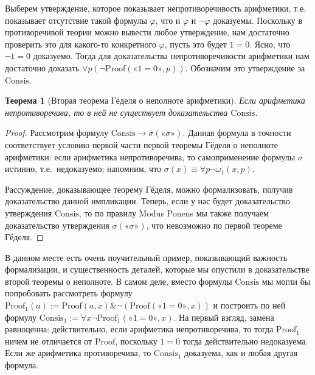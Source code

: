\documentclass[a4paper,11pt]{article}
\newtheorem{thm}{Теорема}[section]
\theoremstyle{definition}
\newcommand{\amp}{\mathbin{\&}}
\newcommand{\gn}[1]{\text{«}#1\text{»}}
\begin{document}
Выберем утверждение, которое показывает непротиворечивость арифметики, т.е.
показывает отсутствие такой формулы $\varphi$, что и $\varphi$ и $\neg\varphi$
доказуемы. Поскольку в противоречивой теории можно вывести любое утверждение,
нам достаточно проверить это для какого-то конкретного $\varphi$, пусть это
будет $1 = 0$. Ясно, что $\neg 1 = 0$ доказуемо. Тогда для доказательства
непротиворечивости арифметики нам достаточно доказать $\forall
p(\neg\mathrm{Proof}(\gn{1 = 0}, p))$. Обозначим это утверждение за
$\mathrm{Consis}$.

\begin{thm}[Вторая теорема Гёделя о неполноте арифметики]
Если арифметика непротиворечива, то в ней не существует доказательства
$\mathrm{Consis}$.
\end{thm}
\begin{proof}
Рассмотрим формулу $\mathrm{Consis} \to \sigma(\gn{\sigma})$. Данная формула в
точности соответствует условию первой части первой теоремы Гёделя о неполноте
арифметики: если арифметика непротиворечива, то самоприменение формулы $\sigma$
истинно, т.е.\ недоказуемо; напомним, что $\sigma(x) \equiv \forall
p\neg\omega_1(x, p)$.

Рассуждение, доказывающее теорему Гёделя, можно формализовать, получив
доказательство данной импликации. Теперь, если у нас будет доказательство
утверждения $\mathrm{Consis}$, то по правилу Modus Ponens мы также получаем
доказательство утверждения $\sigma(\gn{\sigma})$, что невозможно по первой
теореме Гёделя.
\end{proof}

В данном месте есть очень поучительный пример, показывающий важность
формализации, и существенность деталей, которые мы опустили в доказательстве
второй теоремы о неполноте. В самом деле, вместо формулы $\mathrm{Consis}$ мы
могли бы попробовать рассмотреть формулу $\mathrm{Proof}_1(a) :=
\mathrm{Proof}(a, x) \amp \neg(\mathrm{Proof}(\gn{1 = 0}, x))$ и построить по ней
формулу $\mathrm{Consis}_1 := \forall x\neg\mathrm{Proof}_1(\gn{1 = 0}, x)$. На
первый взгляд, замена равноценна: действительно, если арифметика непротиворечива,
то тогда $\mathrm{Proof}_1$ ничем не отличается от $\mathrm{Proof}$, поскольку
$1 = 0$ тогда действительно недоказуема. Если же арифметика противоречива, то
$\mathrm{Consis}_1$ доказуема, как и любая другая формула.
\end{document}
